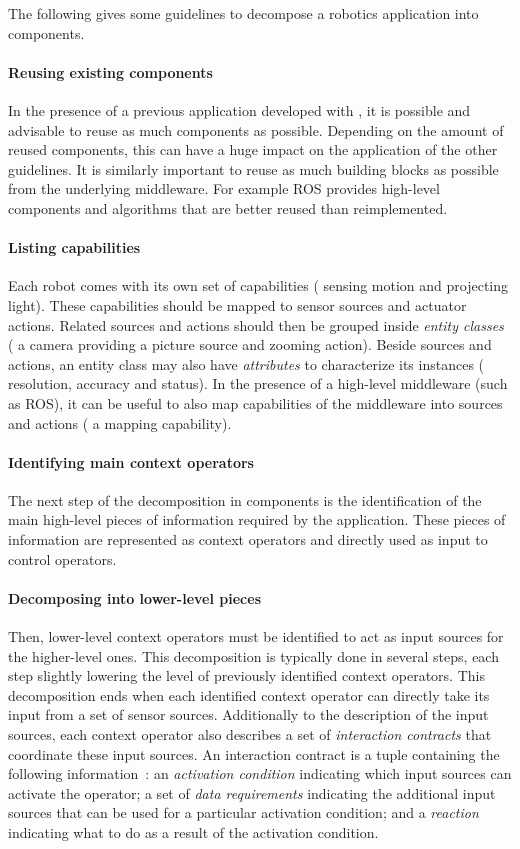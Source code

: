 The following gives some guidelines to decompose a robotics
application into components.

\paragraph{Reusing existing components}
In the presence of a previous application developed with \diaspec{},
it is possible and advisable to reuse as much components as possible.
Depending on the amount of reused components, this can have a huge
impact on the application of the other guidelines. It is similarly
important to reuse as much building blocks as possible from the
underlying middleware. For example ROS provides high-level components
and algorithms that are better reused than reimplemented.

\paragraph{Listing capabilities}
Each robot comes with its own set of capabilities (\eg{} sensing
motion and projecting light). These capabilities should be mapped to
sensor sources and actuator actions. Related sources and actions
should then be grouped inside \emph{entity classes} (\eg{} a camera
providing a picture source and zooming action). Beside sources and
actions, an entity class may also have \emph{attributes} to
characterize its instances (\eg{} resolution, accuracy and status). In
the presence of a high-level middleware (such as ROS), it can be
useful to also map capabilities of the middleware into sources and
actions (\eg{} a mapping capability).

\paragraph{Identifying main context operators}
The next step of the decomposition in components is the identification
of the main high-level pieces of information required by the
application. These pieces of information are represented as context
operators and directly used as input to control operators.

\paragraph{Decomposing into lower-level pieces}
Then, lower-level context operators must be identified to act as input
sources for the higher-level ones. This decomposition is typically
done in several steps, each step slightly lowering the level of
previously identified context operators. This decomposition ends when
each identified context operator can directly take its input from a
set of sensor sources. Additionally to the description of the input
sources, each context operator also describes a set of
\emph{interaction contracts} that coordinate these input sources. An
interaction contract is a tuple containing the following
information~\cite{Cass11a}: an \emph{activation condition} indicating
which input sources can activate the operator; a set of \emph{data
  requirements} indicating the additional input sources that can be
used for a particular activation condition; and a \emph{reaction}
indicating what to do as a result of the activation condition.

